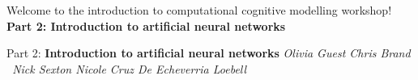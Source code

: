 \documentclass{beamer}
\begin{document}
\begin{frame}
% 
\centering\Huge Welcome to the introduction to computational cognitive modelling workshop! 
\vfill \huge
\centering\textbf{Part 2: Introduction to artificial neural networks} \normalsize
\vfill
\end{frame}

\begin{frame}
% 
\vfill \huge
\centering Part 2: \textbf{Introduction to artificial neural networks} \large
\vfill
\textit{
Olivia Guest \hfill  Chris Brand 
\vspace{0.5cm} \\ \ 
Nick Sexton \hfill Nicole Cruz De Echeverria Loebell } 
\end{frame}
\end{document}
